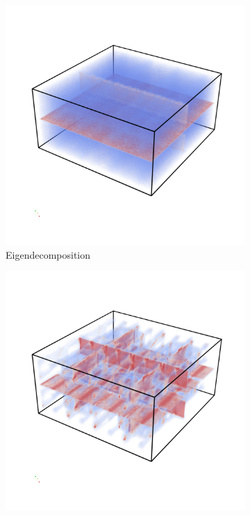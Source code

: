 \begin{figure}[]
    \begin{subfigure}[b]{0.49\textwidth}
        \includegraphics[trim=0 350 0 300, clip=true, width=\textwidth]{Images/shiftXold.png}
        \caption{Eigendecomposition}
        \label{fig:MCeigen}
    \end{subfigure}
    \begin{subfigure}[b]{0.49\textwidth}
        \includegraphics[trim=0 350 0 300, clip=true, width=\textwidth]{Images/shiftXoldchol.png}

\end{subfigure}
\end{figure}
